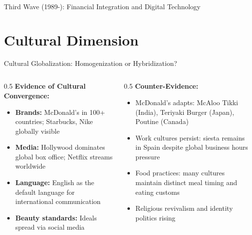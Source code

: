 \documentclass{beamer}
\begin{document}
\begin{frame}{Third Wave (1989-): Financial Integration and Digital Technology}
\begin{itemize}
    \end{itemize}
\end{frame}

\section{Cultural Dimension}
\small
\begin{frame}{Cultural Globalization: Homogenization or Hybridization?}
\begin{columns}
\begin{column}{0.5\textwidth}
    \textbf{Evidence of Cultural Convergence:}
    \begin{itemize}
        \item \textbf{Brands:} McDonald's in 100+ countries; Starbucks, Nike globally visible
        \item \textbf{Media:} Hollywood dominates global box office; Netflix streams worldwide
        \item \textbf{Language:} English as the default language for international communication
        \item \textbf{Beauty standards:} Ideals spread via social media
    \end{itemize}
\end{column}
\pause
\begin{column}{0.5\textwidth}
    \textbf{Counter-Evidence:}
    \begin{itemize}
        \item McDonald's adapts: McAloo Tikki (India), Teriyaki Burger (Japan), Poutine (Canada)
        \item Work cultures persist: siesta remains in Spain despite global business hours pressure
        \item Food practices: many cultures maintain distinct meal timing and eating customs %
        \item Religious revivalism and identity politics rising 
    \end{itemize}
\end{column}
\end{columns}
\end{frame}
\end{document}
